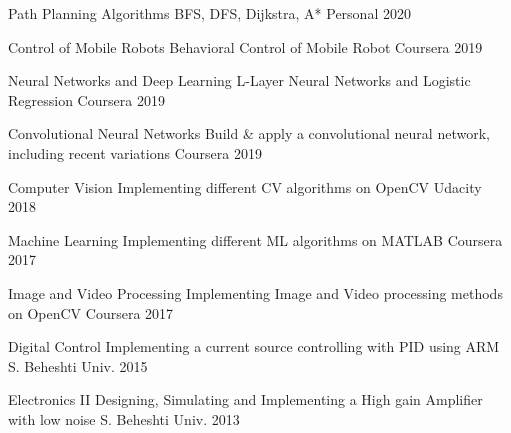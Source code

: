 

\begin{cvhonors}

  \cvhonor
    {Path Planning Algorithms} %
    {BFS, DFS, Dijkstra, A*} %
    {Personal} %
    {2020} %

  \cvhonor
    {Control of Mobile Robots} %
    {Behavioral Control of Mobile Robot} %
    {Coursera} %
    {2019} %

  \cvhonor
    {Neural Networks and Deep Learning} %
    {L-Layer Neural Networks and Logistic Regression} %
    {Coursera} %
    {2019} %
    
  \cvhonor
    {Convolutional Neural Networks} %
    {Build \& apply a convolutional neural network, including recent variations} %
    {Coursera} %
    {2019} %

  \cvhonor
    {Computer Vision} %
    {Implementing different CV algorithms on OpenCV} %
    {Udacity} %
    {2018} %
    
  \cvhonor
    {Machine Learning} %
    {Implementing different ML algorithms on MATLAB} %
    {Coursera} %
    {2017} %
    
  \cvhonor
    {Image and Video Processing} %
    {Implementing Image and Video processing methods on OpenCV} %
    {Coursera} %
    {2017} %

  \cvhonor
    {Digital Control} %
    {Implementing a current source controlling with PID using ARM} %
    {S. Beheshti Univ.} %
    {2015} %



  \cvhonor
    {Electronics II} %
    {Designing, Simulating and Implementing a High gain Amplifier with low noise} %
    {S. Beheshti Univ.} %
    {2013} %

\end{cvhonors}
